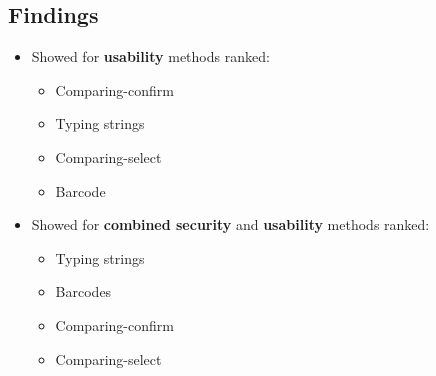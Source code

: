 \subsection{Findings}
\begin{itemize}
    \item Showed for \textbf{usability} methods ranked:
    \begin{itemize}
        \item Comparing-confirm
        \item Typing strings
        \item Comparing-select
        \item Barcode
    \end{itemize}

    \item Showed for \textbf{combined security} and \textbf{usability} methods ranked:
    \begin{itemize}
        \item Typing strings
        \item Barcodes
        \item Comparing-confirm
        \item Comparing-select
    \end{itemize}
\end{itemize}